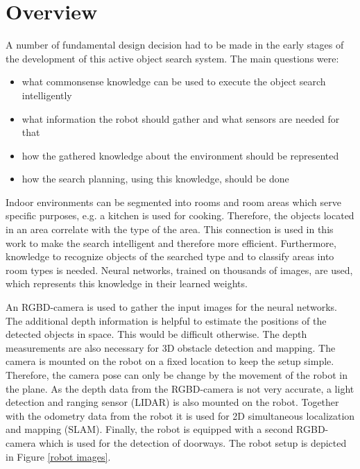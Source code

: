 \section{Overview}

A number of fundamental design decision had to be made in the early stages of the development of this active object search system. The main questions were:
\begin{itemize}
 \item what commonsense knowledge can be used to execute the object search intelligently
 \item what information the robot should gather and what sensors are needed for that
 \item how the gathered knowledge about the environment should be represented
 \item how the search planning, using this knowledge, should be done
\end{itemize}

Indoor environments can be segmented into rooms and room areas which serve specific purposes, e.g. a kitchen is used for cooking. Therefore, the objects located in an area correlate with the type of the area. This connection is used in this work to make the search intelligent and therefore more efficient. Furthermore, knowledge to recognize objects of the searched type and to classify areas into room types is needed. Neural networks, trained on thousands of images, are used, which represents this knowledge in their learned weights.

An RGBD-camera is used to gather the input images for the neural networks. The additional depth information is helpful to estimate the positions of the detected objects in space. This would be difficult otherwise. The depth measurements are also necessary for 3D obstacle detection and mapping. The camera is mounted on the robot on a fixed location to keep the setup simple. Therefore, the camera pose can only be change by the movement of the robot in the plane. As the depth data from the RGBD-camera is not very accurate, a light detection and ranging sensor (LIDAR) is also mounted on the robot. Together with the odometry data from the robot it is used for 2D simultaneous localization and mapping (SLAM). Finally, the robot is equipped with a second RGBD-camera which is used for the detection of doorways. The robot setup is depicted in Figure \ref{robot images}.

